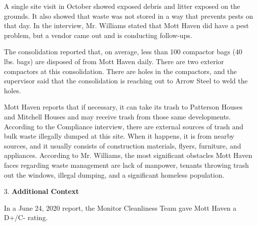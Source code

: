 A single site visit in October showed exposed debris and litter exposed on the grounds. It also showed that waste was not stored in a way that prevents pests on that day. In the interview, Mr. Williams stated that Mott Haven did have a pest problem, but a vendor came out and is conducting follow-ups.

The consolidation reported that, on average, less than 100 compactor bags (40 lbs. bags) are disposed of from Mott Haven daily. There are two exterior compactors at this consolidation. There are holes in the compactors, and the supervisor said that the consolidation is reaching out to Arrow Steel to weld the holes.

Mott Haven reports that if necessary, it can take its trash to Patterson Houses and Mitchell Houses and may receive trash from those same developments. According to the Compliance interview, there are external sources of trash and bulk waste illegally dumped at this site. When it happens, it is from nearby sources, and it usually consists of construction materials, flyers, furniture, and appliances. According to Mr. Williams, the most significant obstacles Mott Haven faces regarding waste management are lack of manpower, tenants throwing trash out the windows, illegal dumping, and a significant homeless population.

3. \textbf{Additional Context}

In a June 24, 2020 report, the Monitor Cleanliness Team gave Mott Haven a D+/C- rating. 